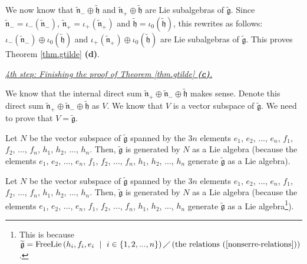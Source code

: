 \documentclass[etingof-lie.tex]{subfiles}
\begin{document}
We now know that $\widetilde{\mathfrak{n}}_{-}\oplus\widetilde{\mathfrak{h}}$
and $\widetilde{\mathfrak{n}}_{+}\oplus\widetilde{\mathfrak{h}}$ are Lie
subalgebras of $\widetilde{\mathfrak{g}}$. Since $\widetilde{\mathfrak{n}}%
_{-}=\iota_{-}\left(  \widetilde{\mathfrak{n}}_{-}\right)  $,
$\widetilde{\mathfrak{n}}_{+}=\iota_{+}\left(  \widetilde{\mathfrak{n}}%
_{+}\right)  $ and $\widetilde{\mathfrak{h}}=\iota_{0}\left(
\widetilde{\mathfrak{h}}\right)  $, this rewrites as follows: $\iota
_{-}\left(  \widetilde{\mathfrak{n}}_{-}\right)  \oplus\iota_{0}\left(
\widetilde{\mathfrak{h}}\right)  $ and $\iota_{+}\left(
\widetilde{\mathfrak{n}}_{+}\right)  \oplus\iota_{0}\left(
\widetilde{\mathfrak{h}}\right)  $ are Lie subalgebras of
$\widetilde{\mathfrak{g}}$. This proves Theorem \ref{thm.gtilde} \textbf{(d)}.

\bigskip

\underline{\textit{4th step: Finishing the proof of Theorem \ref{thm.gtilde}
\textbf{(c)}.}}

We know that the internal direct sum $\widetilde{\mathfrak{n}}_{+}%
\oplus\widetilde{\mathfrak{n}}_{-}\oplus\widetilde{\mathfrak{h}}$ makes sense.
Denote this direct sum $\widetilde{\mathfrak{n}}_{+}\oplus
\widetilde{\mathfrak{n}}_{-}\oplus\widetilde{\mathfrak{h}}$ as $V$. We know
that $V$ is a vector subspace of $\widetilde{\mathfrak{g}}$. We need to prove
that $V=\widetilde{\mathfrak{g}}$.

\begin{vershort}
Let $N$ be the vector subspace of $\widetilde{\mathfrak{g}}$ spanned by the
$3n$ elements $e_{1}$, $e_{2}$, $...$, $e_{n}$, $f_{1}$, $f_{2}$, $...$,
$f_{n}$, $h_{1}$, $h_{2}$, $...$, $h_{n}$. Then, $\widetilde{\mathfrak{g}}$ is
generated by $N$ as a Lie algebra (because the elements $e_{1}$, $e_{2}$,
$...$, $e_{n}$, $f_{1}$, $f_{2}$, $...$, $f_{n}$, $h_{1}$, $h_{2}$, $...$,
$h_{n}$ generate $\widetilde{\mathfrak{g}}$ as a Lie algebra).
\end{vershort}

\begin{verlong}
Let $N$ be the vector subspace of $\widetilde{\mathfrak{g}}$ spanned by the
$3n$ elements $e_{1}$, $e_{2}$, $...$, $e_{n}$, $f_{1}$, $f_{2}$, $...$,
$f_{n}$, $h_{1}$, $h_{2}$, $...$, $h_{n}$. Then, $\widetilde{\mathfrak{g}}$ is
generated by $N$ as a Lie algebra (because the elements $e_{1}$, $e_{2}$,
$...$, $e_{n}$, $f_{1}$, $f_{2}$, $...$, $f_{n}$, $h_{1}$, $h_{2}$, $...$,
$h_{n}$ generate $\widetilde{\mathfrak{g}}$ as a Lie algebra\footnote{This is
because $\widetilde{\mathfrak{g}}=\operatorname*{FreeLie}\left(  h_{i}%
,f_{i},e_{i}\ \mid\ i\in\left\{  1,2,...,n\right\}  \right)  \diagup\left(
\text{the relations (\ref{nonserre-relations})}\right)  $.}).
\end{verlong}
\end{document}
